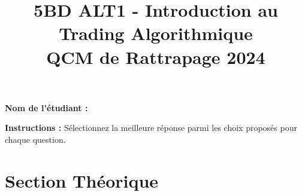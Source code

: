 \documentclass[a4paper,12pt]{article}
\title{5BD ALT1 - Introduction au Trading Algorithmique \\ \textbf{QCM de Rattrapage 2024}}
\author{}
\date{}
\begin{document}
\maketitle

\vspace{1cm}

\textbf{Nom de l'étudiant :} \underline{\hspace{10cm}}

\vspace{1cm}

\textbf{Instructions :} Sélectionnez la meilleure réponse parmi les choix proposés pour chaque question.

\vspace{0.5cm}

\section*{Section Théorique}
\end{document}
